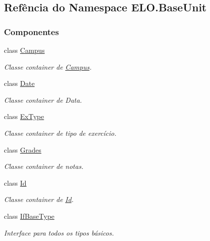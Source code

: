 \hypertarget{namespaceELO_1_1BaseUnit}{}\subsection{Refência do Namespace E\+L\+O.\+Base\+Unit}
\label{namespaceELO_1_1BaseUnit}
\subsubsection*{Componentes}
\begin{DoxyCompactItemize}
\item 
class \hyperlink{classELO_1_1BaseUnit_1_1Campus}{Campus}
\begin{DoxyCompactList}\small\item\em Classe container de \hyperlink{classELO_1_1BaseUnit_1_1Campus}{Campus}. \end{DoxyCompactList}\item 
class \hyperlink{classELO_1_1BaseUnit_1_1Date}{Date}
\begin{DoxyCompactList}\small\item\em Classe container de Data. \end{DoxyCompactList}\item 
class \hyperlink{classELO_1_1BaseUnit_1_1ExType}{Ex\+Type}
\begin{DoxyCompactList}\small\item\em Classe container de tipo de exercício. \end{DoxyCompactList}\item 
class \hyperlink{classELO_1_1BaseUnit_1_1Grades}{Grades}
\begin{DoxyCompactList}\small\item\em Classe container de notas. \end{DoxyCompactList}\item 
class \hyperlink{classELO_1_1BaseUnit_1_1Id}{Id}
\begin{DoxyCompactList}\small\item\em Classe container de \hyperlink{classELO_1_1BaseUnit_1_1Id}{Id}. \end{DoxyCompactList}\item 
class \hyperlink{classELO_1_1BaseUnit_1_1IfBaseType}{If\+Base\+Type}
\begin{DoxyCompactList}\small\item\em Interface para todos os tipos básicos. \end{DoxyCompactList}\item 

\end{DoxyCompactItemize}
